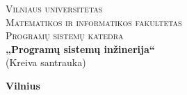 \begin{titlepage}

  \begin{center}

    \textsc{\Large Vilniaus universitetas\\
    Matematikos ir informatikos fakultetas\\
    Programų sistemų katedra}\\[6.0cm]

    \textbf{ \LARGE „Programų sistemų inžinerija“ }\\
    { \Large (Kreiva santrauka)}\\[0.5cm]

    \vfill

    \textbf{\large  Vilnius \\ \the\year }
  \end{center}
  
\end{titlepage}
